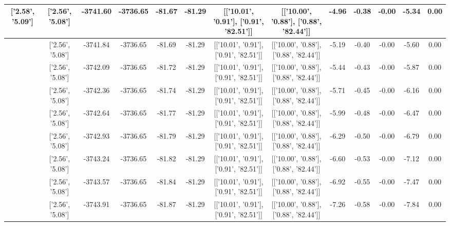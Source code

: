 \begin{table}[htbp]
\begin{adjustbox}{angle=90}
\begin{tabular}{|c|c|c|c|c|c|c|c|c|c|c|c|c|}
 ['2.58', '5.09'] & ['2.56', '5.08'] & -3741.60 & -3736.65 & -81.67 & -81.29 & [['10.01', '0.91'], ['0.91', '82.51']] & [['10.00', '0.88'], ['0.88', '82.44']] & -4.96 & -0.38 & -0.00 & -5.34 & 0.00\\ \hline
 ['2.58', '5.09'] & ['2.56', '5.08'] & -3741.84 & -3736.65 & -81.69 & -81.29 & [['10.01', '0.91'], ['0.91', '82.51']] & [['10.00', '0.88'], ['0.88', '82.44']] & -5.19 & -0.40 & -0.00 & -5.60 & 0.00\\ \hline
 ['2.58', '5.09'] & ['2.56', '5.08'] & -3742.09 & -3736.65 & -81.72 & -81.29 & [['10.01', '0.91'], ['0.91', '82.51']] & [['10.00', '0.88'], ['0.88', '82.44']] & -5.44 & -0.43 & -0.00 & -5.87 & 0.00\\ \hline
 ['2.58', '5.09'] & ['2.56', '5.08'] & -3742.36 & -3736.65 & -81.74 & -81.29 & [['10.01', '0.91'], ['0.91', '82.51']] & [['10.00', '0.88'], ['0.88', '82.44']] & -5.71 & -0.45 & -0.00 & -6.16 & 0.00\\ \hline
 ['2.59', '5.09'] & ['2.56', '5.08'] & -3742.64 & -3736.65 & -81.77 & -81.29 & [['10.01', '0.91'], ['0.91', '82.51']] & [['10.00', '0.88'], ['0.88', '82.44']] & -5.99 & -0.48 & -0.00 & -6.47 & 0.00\\ \hline
 ['2.59', '5.09'] & ['2.56', '5.08'] & -3742.93 & -3736.65 & -81.79 & -81.29 & [['10.01', '0.91'], ['0.91', '82.51']] & [['10.00', '0.88'], ['0.88', '82.44']] & -6.29 & -0.50 & -0.00 & -6.79 & 0.00\\ \hline
 ['2.59', '5.09'] & ['2.56', '5.08'] & -3743.24 & -3736.65 & -81.82 & -81.29 & [['10.01', '0.91'], ['0.91', '82.51']] & [['10.00', '0.88'], ['0.88', '82.44']] & -6.60 & -0.53 & -0.00 & -7.12 & 0.00\\ \hline
 ['2.59', '5.09'] & ['2.56', '5.08'] & -3743.57 & -3736.65 & -81.84 & -81.29 & [['10.01', '0.91'], ['0.91', '82.51']] & [['10.00', '0.88'], ['0.88', '82.44']] & -6.92 & -0.55 & -0.00 & -7.47 & 0.00\\ \hline
 ['2.59', '5.09'] & ['2.56', '5.08'] & -3743.91 & -3736.65 & -81.87 & -81.29 & [['10.01', '0.91'], ['0.91', '82.51']] & [['10.00', '0.88'], ['0.88', '82.44']] & -7.26 & -0.58 & -0.00 & -7.84 & 0.00\\ \hline
            \end{tabular}
        \end{adjustbox}
        \caption{}
        \label{}
    \end{table}
    